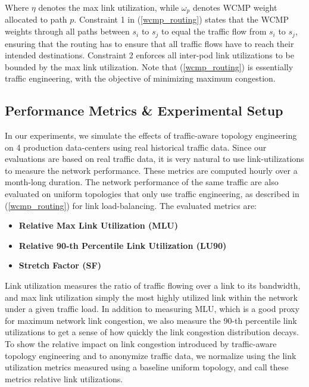 \documentclass[sigconf]{acmart}
\theoremstyle{definition}
\begin{document}
Where $\eta$ denotes the max link utilization, while $\omega_p$ denotes WCMP weight allocated to path $p$. Constraint 1 in (\ref{wcmp_routing}) states that the WCMP weights through all paths between $s_i$ to $s_j$ to equal the traffic flow from $s_i$ to $s_j$, ensuring that the routing has to ensure that all traffic flows have to reach their intended destinations. Constraint 2 enforces all inter-pod link utilizations to be bounded by the max link utilization. Note that (\ref{wcmp_routing}) is essentially traffic engineering, with the objective of minimizing maximum congestion.


\subsection{Performance Metrics \& Experimental Setup}
In our experiments, we simulate the effects of traffic-aware topology engineering on 4 production data-centers using real historical traffic data. Since our evaluations are based on real traffic data, it is very natural to use link-utilizations to measure the network performance. These metrics are computed hourly over a month-long duration. The network performance of the same traffic are also evaluated on uniform topologies that only use traffic engineering, as described in (\ref{wcmp_routing}) for link load-balancing. The evaluated metrics are:

\begin{itemize}
    \item \textbf{Relative Max Link Utilization (MLU)}
    \item \textbf{Relative 90-th Percentile Link Utilization (LU90)}
    \item \textbf{Stretch Factor (SF)}
\end{itemize}

Link utilization measures the ratio of traffic flowing over a link to its bandwidth, and max link utilization simply the most highly utilized link within the network under a given traffic load. In addition to measuring MLU, which is a good proxy for maximum network link congestion, we also measure the 90-th percentile link utilizations to get a sense of how quickly the link congestion distribution decays. To show the relative impact on link congestion introduced by traffic-aware topology engineering and to anonymize traffic data, we normalize using the link utilization metrics measured using a baseline uniform topology, and call these metrics relative link utilizations.
\end{document}
